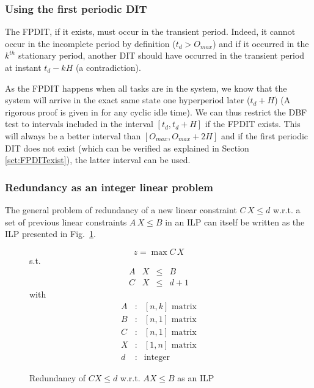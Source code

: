 \documentclass[conference]{IEEEtran}
\begin{document}
\subsubsection{Using the first periodic DIT}

The FPDIT, if it exists, must occur in the transient period. Indeed, it cannot occur in the incomplete period by definition ($t_d > O_{max}$) and if it occurred in the $k^{th}$ stationary period, another DIT should have occurred in the transient period at instant $t_d - k H$ (a contradiction).

As the FPDIT happens when all tasks are in the system, we know that the system will arrive in the exact same state one hyperperiod later ($t_d + H$) (A rigorous proof is given in \cite{choquet2004minimal} for any cyclic idle time). We can thus restrict the DBF test to intervals included in the interval $[t_d, t_d + H]$ if the FPDIT exists. This will always be a better interval than $[O_{max}, O_{max} + 2H]$ and if the first periodic DIT does not exist (which can be verified as explained in Section \ref{sct:FPDITexist}), the latter interval can be used.

\subsubsection{Redundancy as an integer linear problem}

The general problem of redundancy of a new linear constraint $C \, X \leq d$ w.r.t. a set of previous linear constraints $A \, X \leq B$ in an ILP can itself be written as the ILP presented in Fig.~\ref{fig:redILP}.

\begin{figure}[h]
$$z = \max C \, X$$
s.t.
\[
\begin{array}{rccc}
  A & X &\leq & B \\
  C & X &\leq & d + 1
\end{array}
\]
with
\[
  \begin{array}{ccc}
    A & : & [n,k] \text{ matrix}\\
    B & : & [n,1] \text{ matrix}\\
    C & : & [n,1] \text{ matrix}\\
    X & : & [1,n] \text{ matrix}\\
    d & : & \text{integer}
  \end{array}
\]
\caption{Redundancy of $CX \leq d$ w.r.t. $A X \leq B$ as an ILP}
\label{fig:redILP}
\end{figure}
\end{document}
